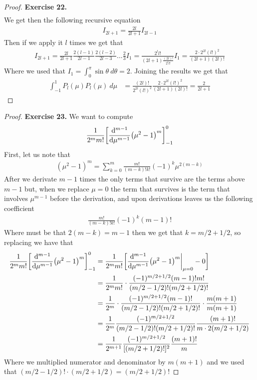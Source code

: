 \documentclass[11pt]{article}
\theoremstyle{definition}
\begin{document}
\begin{proof}{\textbf{Exercise 22.}}
\begin{align*}
\end{align*}
We get then the following recursive equation
\begin{align*}
I_{2l + 1} = \frac{2l}{2l + 1}I_{2l - 1}
\end{align*}
Then if we apply it $l$ times we get that
\begin{align*}
I_{2l + 1}
= \frac{2l}{2l + 1}\frac{2(l -1)}{2l -1}\frac{2(l - 2)}{2l - 3} ... \frac{2}{3}I_1
= \frac{2^ll!}{(2l + 1)\frac{(2l)!}{2^{l}l!}} I_1
= \frac{2\cdot 2^{2l} (l!)^2}{(2l + 1)(2l)!}
\end{align*}
Where we used that $I_1 = \int_0^\pi \sin\theta~d\theta = 2$.
Joining the results we get that
\begin{align*}
\int_{-1}^1 P_l(\mu)P_l(\mu)~d\mu
&= \frac{(2l)!}{2^{2l}(l!)^2}\frac{2\cdot 2^{2l} (l!)^2}{(2l + 1)(2l)!}
= \frac{2}{2l + 1}
\end{align*}
\end{proof}

\cleardoublepage
\begin{proof}{\textbf{Exercise 23.}}
We want to compute
\begin{align*}
    \frac{1}{2^m m!}\bigg[\dv[m-1]{\mu} (\mu^2 - 1)^m\bigg]_{-1}^0
\end{align*}
First, let us note that
\begin{align*}
    (\mu^2 - 1)^m = \sum_{k=0}^m \frac{m!}{(m-k)!k!} (-1)^k \mu^{2(m-k)}
\end{align*}
After we derivate $m-1$ times the only terms that survive are the terms
above $m-1$ but, when we replace $\mu = 0$ the term that survives is
the term that involves $\mu^{m-1}$ before the derivation, and upon derivations
leaves us the following coefficient
\begin{align*}
    \frac{m!}{(m-k)!k!} (-1)^k (m -1)!
\end{align*}
Where must be that $2(m -k) = m - 1$ then we get that $k = m/2 + 1/2$,
so replacing we have that
\begin{align*}
    \frac{1}{2^m m!}\bigg[\dv[m-1]{\mu} (\mu^2 - 1)^m\bigg]_{-1}^0
    &= \frac{1}{2^m m!}\bigg[\dv[m-1]{\mu} (\mu^2 - 1)^m\bigg|_{\mu=0} - 0\bigg]\\
    &= \frac{1}{2^m m!}
    \cdot \frac{(-1)^{m/2 + 1/2} (m -1)!m!}{(m/2 - 1/2)!(m/2 + 1/2)!}\\
    &= \frac{1}{2^m}
    \cdot \frac{(-1)^{m/2 + 1/2} (m -1)!}{(m/2 - 1/2)!(m/2 + 1/2)!}
    \cdot \frac{m(m+1)}{m(m+1)}\\
    &= \frac{1}{2^m}
    \frac{(-1)^{m/2 + 1/2}}{(m/2 - 1/2)!(m/2 + 1/2)!}
    \frac{(m + 1)!}{m\cdot 2(m/2 + 1/2)}\\
    &= \frac{1}{2^{m+1}}
    \frac{(-1)^{m/2 + 1/2}}{[(m/2 + 1/2)!]^{2}}
    \frac{(m + 1)!}{m}
\end{align*}
Where we multiplied numerator and denominator by $m(m + 1)$ and we used that
$(m/2 - 1/2)!\cdot(m/2 + 1/2) = (m/2 + 1/2)!$
\end{proof}
\end{document}
